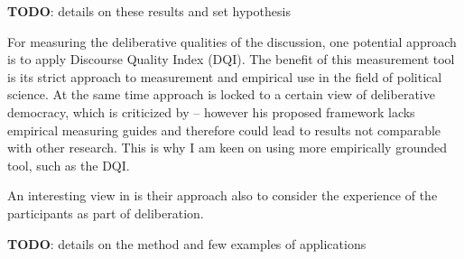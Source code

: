 \documentclass[journal,a4paper]{IEEEtran}
\begin{document}
\textbf{TODO}: details on these results and set hypothesis

For measuring the deliberative qualities of the discussion, one potential approach is to apply  Discourse Quality Index (DQI). The benefit of this measurement tool is its strict approach to measurement and empirical use in the field of political science. At the same time  approach is locked to a certain view of deliberative democracy, which is criticized by  -- however his proposed framework lacks empirical measuring guides and therefore could lead to results not comparable with other research. This is why I am keen on using more empirically grounded tool, such as the DQI.

An interesting view in  is their approach also to consider the experience of the participants as part of deliberation.

\textbf{TODO}: details on the method and few examples of applications



\end{document}
